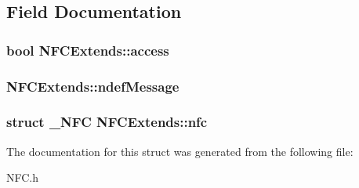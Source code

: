 \subsection{Field Documentation}
\subsubsection[{access}]{\setlength{\rightskip}{0pt plus 5cm}bool N\-F\-C\-Extends\-::access}\label{structNFCExtends_aaf16491c4fd96d422afa6a366cb16e63}
\subsubsection[{ndef\-Message}]{ N\-F\-C\-Extends\-::ndef\-Message}\label{structNFCExtends_a7694a42bbcafbb86fca7ce968ab30073}
\subsubsection[{nfc}]{\setlength{\rightskip}{0pt plus 5cm}struct {\bf \-\_\-\-N\-F\-C} N\-F\-C\-Extends\-::nfc}\label{structNFCExtends_aed664db6d799a193053b271db29c18e2}


The documentation for this struct was generated from the following file\-:\begin{DoxyCompactItemize}
\item 
N\-F\-C.\-h\end{DoxyCompactItemize}
